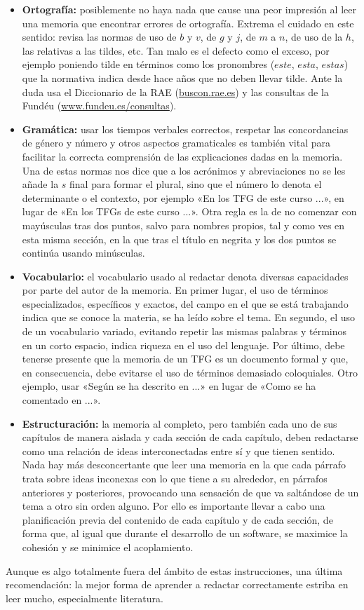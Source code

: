 \begin{itemize}
    \item \textbf{Ortografía:} posiblemente no haya nada que cause una peor impresión al leer una memoria que encontrar errores de ortografía. Extrema el cuidado en este sentido: revisa las normas de uso de $b$ y $v$, de $g$ y $j$, de $m$ a $n$, de uso de la $h$, las relativas a las tildes, etc. Tan malo es el defecto como el exceso, por ejemplo poniendo tilde en términos como los pronombres ($este$, $esta$, $estas$) que la normativa indica desde hace años que no deben llevar tilde. Ante la duda usa el Diccionario de la RAE (\url{buscon.rae.es}) y las consultas de la Fundéu (\url{www.fundeu.es/consultas}).

    \item \textbf{Gramática:} usar los tiempos verbales correctos, respetar las concordancias de género y número y otros aspectos gramaticales es también vital para facilitar la correcta comprensión de las explicaciones dadas en la memoria. Una de estas normas nos dice que a los acrónimos y abreviaciones no se les añade la $s$ final para formar el plural, sino que el número lo denota el determinante o el contexto, por ejemplo «En los TFG de este curso ...», en lugar de «En los TFGs de este curso ...». Otra regla es la de no comenzar con mayúsculas tras dos puntos, salvo para nombres propios, tal y como ves en esta misma sección, en la que tras el título en negrita y los dos puntos se continúa usando minúsculas.

    \item \textbf{Vocabulario:} el vocabulario usado al redactar denota diversas capacidades por parte del autor de la memoria. En primer lugar, el uso de términos especializados, específicos y exactos, del campo en el que se está trabajando indica que se conoce la materia, se ha leído sobre el tema. En segundo, el uso de un vocabulario variado, evitando repetir las mismas palabras y términos en un corto espacio, indica riqueza en el uso del lenguaje. Por último, debe tenerse presente que la memoria de un TFG es un documento formal y que, en consecuencia, debe evitarse el uso de términos demasiado coloquiales. Otro ejemplo, usar «Según se ha descrito en ...» en lugar de «Como se ha comentado en ...».

    \item \textbf{Estructuración:} la memoria al completo, pero también cada uno de sus capítulos de manera aislada y cada sección de cada capítulo, deben redactarse como una relación de ideas interconectadas entre sí y que tienen sentido. Nada hay más desconcertante que leer una memoria en la que cada párrafo trata sobre ideas inconexas con lo que tiene a su alrededor, en párrafos anteriores y posteriores, provocando una sensación de que va saltándose de un tema a otro sin orden alguno. Por ello es importante llevar a cabo una planificación previa del contenido de cada capítulo y de cada sección, de forma que, al igual que durante el desarrollo de un software, se maximice la cohesión y se minimice el acoplamiento.
\end{itemize}

Aunque es algo totalmente fuera del ámbito de estas instrucciones, una última recomendación: la mejor forma de aprender a redactar correctamente estriba en leer mucho, especialmente literatura.